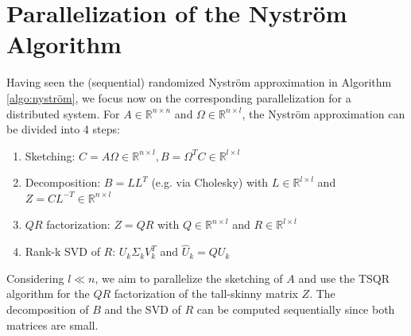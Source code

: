 \documentclass{article}
\theoremstyle{definition}
\begin{document}
\section{Parallelization of the Nyström Algorithm}\label{sec:parallel_nystrom}
Having seen the (sequential) randomized Nyström approximation in Algorithm \ref{algo:nyström}, we focus now on the corresponding parallelization for a distributed system. For $A \in \mathbb{R}^{n \times n}$ and $\Omega \in \mathbb{R}^{n \times l}$, the Nyström approximation can be divided into 4 steps:
\begin{enumerate}
    \item Sketching: $C = A \Omega \in \mathbb{R}^{n \times l}, B = \Omega^T C \in \mathbb{R}^{l \times l}$
    \item Decomposition: $B = LL^T$ (e.g. via Cholesky) with $L \in \mathbb{R}^{l \times l}$ and $Z = C L^{-T} \in \mathbb{R}^{n \times l}$
    \item $QR$ factorization: $Z = QR$ with $Q \in \mathbb{R}^{n \times l}$ and $R \in \mathbb{R}^{l \times l}$
    \item Rank-k SVD of $R$: $U_k \Sigma_k V_k^T$ and $\hat{U}_k = Q U_k$
\end{enumerate}
Considering $l \ll n$, we aim to parallelize the sketching of $A$ and use the TSQR algorithm for the $QR$ factorization of the tall-skinny matrix $Z$. The decomposition of $B$ and the SVD of $R$ can be computed sequentially since both matrices are small.
\end{document}
